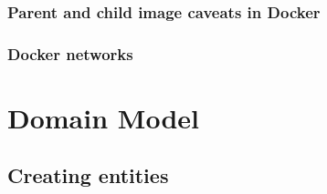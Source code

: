 \documentclass{article}
\begin{document}
\subsubsection{Parent and child image caveats in Docker}

\subsubsection{Docker networks}

\section{Domain Model}

\subsection{Creating entities}
\end{document}
